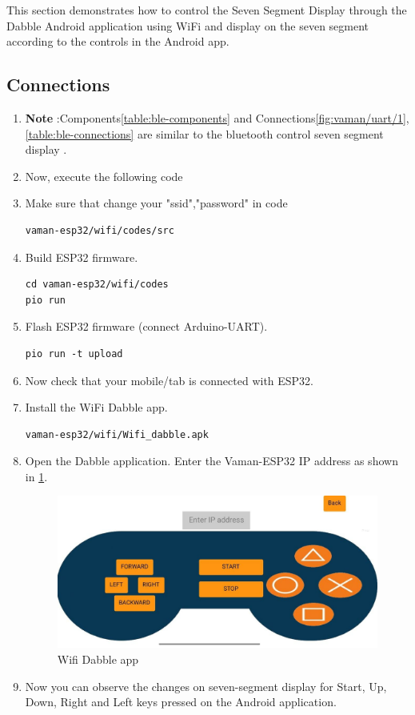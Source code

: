 This section demonstrates how to control the Seven Segment Display through the
Dabble Android application using WiFi and display on the seven segment according
to the controls in the Android app.

\subsection{Connections}
\begin{enumerate}[label=\thesection.\arabic*.,ref=\thesection.\theenumi]
\item \textbf{Note} :Components\ref{table:ble-components} and  Connections\ref{fig:vaman/uart/1},\ref{table:ble-connections} are similar to the bluetooth control seven segment display .
\item Now, execute the following code
\item Make sure that change your "ssid","password" in code 
\begin{lstlisting}
vaman-esp32/wifi/codes/src
\end{lstlisting}
\item Build ESP32 firmware.
\begin{lstlisting}
cd vaman-esp32/wifi/codes
pio run 
\end{lstlisting}
\item Flash ESP32 firmware (connect Arduino-UART).
\begin{lstlisting}
pio run -t upload
\end{lstlisting}
\item Now check that your mobile/tab is connected with ESP32.
\item Install the WiFi Dabble app.
\begin{lstlisting}
vaman-esp32/wifi/Wifi_dabble.apk
\end{lstlisting}

\item Open the Dabble application. Enter the Vaman-ESP32 IP address as shown 
in \ref{fig:dabble}.
\begin{figure}[!ht]
\centering
\includegraphics[width=0.6\columnwidth]{figs/wifi.jpg}
\caption{Wifi Dabble app}
\label{fig:dabble}
\end{figure}
\item Now you can observe the changes on seven-segment display for Start, Up, 
Down, Right and Left keys pressed on the Android application.
\end{enumerate}